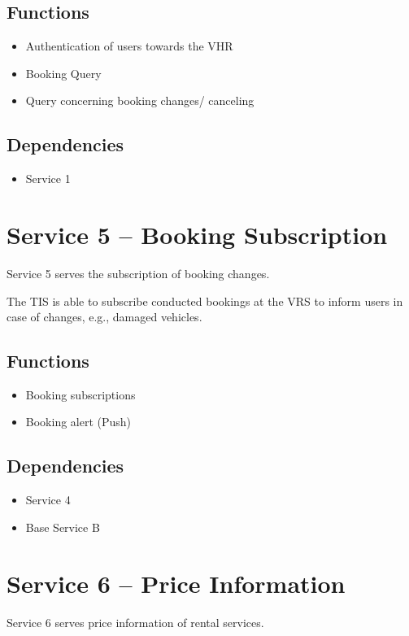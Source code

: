 \subsection*{Functions}
\begin{itemize}
\item Authentication of users towards the VHR 
\item Booking Query
\item Query concerning booking changes/ canceling
\end{itemize}

\subsection*{Dependencies}
\begin{itemize}
\item Service 1
\end{itemize}

\section{Service 5 -- Booking Subscription}
\label{sec:Hierachiemodell:Dienst5}
Service 5 serves the subscription of booking changes.

The TIS is able to subscribe conducted bookings at the VRS to inform users in case of changes, e.g., damaged vehicles.
\subsection*{Functions}
\begin{itemize}
\item Booking subscriptions 
\item Booking alert (Push)
\end{itemize}

\subsection*{Dependencies}
\begin{itemize}
\item Service 4
\item Base Service B
\end{itemize}

\section{Service 6 -- Price Information}
\label{sec:Hierachiemodell:Dienst6}
Service 6 serves price information of rental services.

